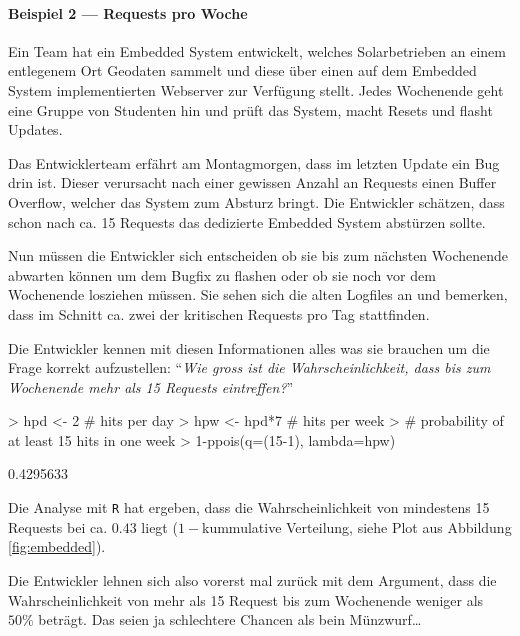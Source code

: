 \paragraph{Beispiel 2 --- Requests pro Woche}
Ein Team hat ein \gls{Embedded System} entwickelt, welches
Solarbetrieben an einem entlegenem Ort Geodaten sammelt und diese
über einen auf dem Embedded System implementierten Webserver
zur Verfügung stellt. Jedes Wochenende geht eine Gruppe von 
Studenten hin und prüft das System, macht Resets und flasht Updates.

Das Entwicklerteam erfährt am Montagmorgen, dass im letzten Update
ein Bug drin ist. Dieser verursacht nach einer gewissen Anzahl
an Requests einen \gls{Buffer Overflow}, welcher das System 
zum Absturz bringt. Die Entwickler schätzen, dass schon nach ca. 15 
Requests das dedizierte Embedded System abstürzen sollte.

Nun müssen die Entwickler sich entscheiden ob sie bis zum nächsten
Wochenende abwarten können um dem Bugfix zu flashen oder ob sie
noch vor dem Wochenende losziehen müssen. Sie sehen sich die alten
Logfiles an und bemerken, dass im Schnitt ca. zwei der kritischen
Requests pro Tag stattfinden.

Die Entwickler kennen mit diesen Informationen alles was sie
brauchen um die Frage korrekt aufzustellen: "`\emph{Wie gross
ist die Wahrscheinlichkeit, dass bis zum Wochenende mehr als 
15 Requests eintreffen?}"'

\begin{Schunk}
\begin{Sinput}
> hpd <- 2 # hits per day
> hpw <- hpd*7 # hits per week
> # probability of at least 15 hits in one week
> 1-ppois(q=(15-1), lambda=hpw)
\end{Sinput}
\begin{Soutput}
[1] 0.4295633
\end{Soutput}
\end{Schunk}



Die Analyse mit \lstinline{R} hat ergeben, dass die 
Wahrscheinlichkeit von mindestens 15 Requests bei ca. $0.43$ liegt
($1-$kummulative Verteilung, siehe Plot aus Abbildung \ref{fig:embedded}).

Die Entwickler lehnen sich also vorerst mal zurück mit dem Argument,
dass die Wahrscheinlichkeit von mehr als 15 Request bis zum 
Wochenende weniger als $50\%$ beträgt. Das seien ja schlechtere Chancen
als bein Münzwurf\dots


